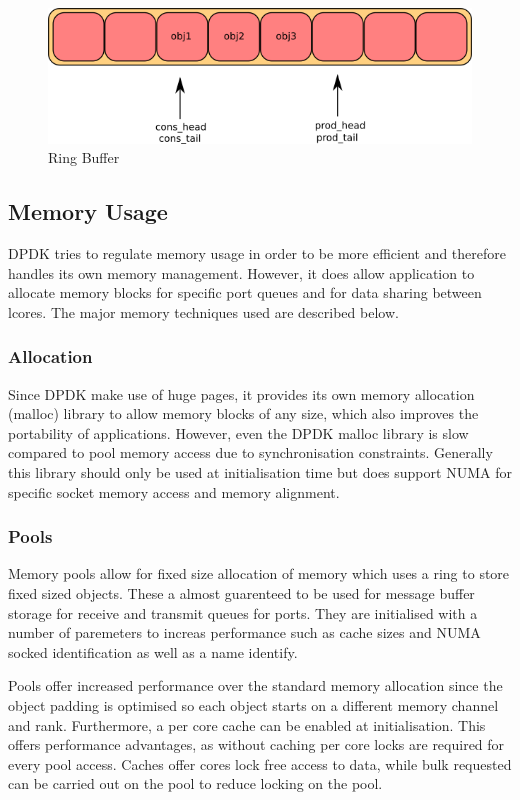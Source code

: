 \documentclass[final_report.tex]{subfiles}
\begin{document}
\begin{figure}[H]
	\centering
	\includegraphics[width=\textwidth]{img/ring.png}
	\caption{Ring Buffer}
	\label{fig:ring}
\end{figure}

\subsection{Memory Usage}
DPDK tries to regulate memory usage in order to be more efficient and therefore handles its own memory management. However, it does allow application to allocate memory blocks for specific port queues and for data sharing between lcores. The major memory techniques used are described below.


\subsubsection{Allocation}
Since DPDK make use of huge pages, it provides its own memory allocation (malloc) library to allow memory blocks of any size, which also improves the portability of applications. However, even the DPDK malloc library is slow compared to pool memory access due to synchronisation constraints. Generally this library should only be used at initialisation time but does support NUMA for specific socket memory access and memory alignment.

\subsubsection{Pools}
Memory pools allow for fixed size allocation of memory which uses a ring to store fixed sized objects. These a almost guarenteed to be used for message buffer storage for receive and transmit queues for ports. They are initialised with a number of paremeters to increas performance such as cache sizes and NUMA socked identification as well as a name identify.

Pools offer increased performance over the standard memory allocation since the object padding is optimised so each object starts on a different memory channel and rank. Furthermore, a per core cache can be enabled at initialisation. This offers performance advantages, as without caching per core locks are required for every pool access. Caches offer cores lock free access to data, while bulk requested can be carried out on the pool to reduce locking on the pool.
\end{document}
